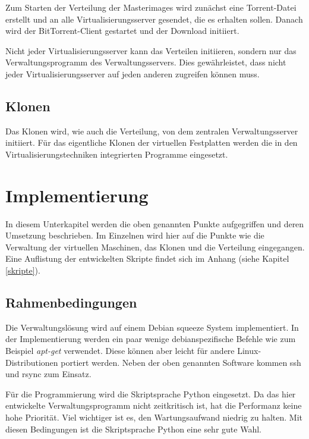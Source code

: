 Zum Starten der Verteilung der Masterimages wird zunächst eine Torrent-Datei erstellt und an alle Virtualisierungsserver gesendet, die es erhalten sollen. Danach wird der BitTorrent-Client gestartet und der Download initiiert.

Nicht jeder Virtualisierungsserver kann das Verteilen initiieren, sondern nur das Verwaltungsprogramm des Verwaltungsservers. Dies gewährleistet, dass nicht jeder Virtualisierungsserver auf jeden anderen zugreifen können muss.

\subsection{Klonen}
Das Klonen wird, wie auch die Verteilung, von dem zentralen Verwaltungsserver initiiert. Für das eigentliche Klonen der virtuellen Festplatten werden die in den Virtualisierungstechniken integrierten Programme eingesetzt. 

\section{Implementierung}
In diesem Unterkapitel werden die oben genannten Punkte aufgegriffen und deren Umsetzung beschrieben. Im Einzelnen wird hier auf die Punkte wie die Verwaltung der virtuellen Maschinen, das Klonen und die Verteilung eingegangen. Eine Auflistung der entwickelten Skripte findet sich im Anhang (siehe Kapitel \ref{skripte}).

\subsection{Rahmenbedingungen}
Die Verwaltungslösung wird auf einem Debian squeeze System implementiert. In der Implementierung werden ein paar wenige debianspezifische Befehle wie zum Beispiel \textit{apt-get} verwendet. Diese können aber leicht für andere Linux-Distributionen portiert werden. Neben der oben genannten Software kommen ssh und rsync zum Einsatz.

Für die Programmierung wird die Skriptsprache Python eingesetzt. Da das hier entwickelte Verwaltungsprogramm nicht zeitkritisch ist, hat die Performanz keine hohe Priorität. Viel wichtiger ist es, den Wartungsaufwand niedrig zu halten. Mit diesen Bedingungen ist die Skriptsprache Python eine sehr gute Wahl.

